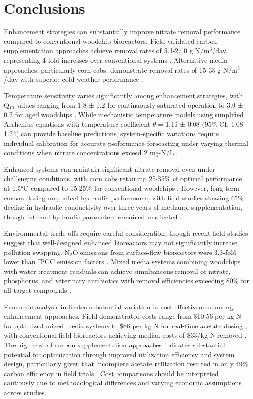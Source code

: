 \documentclass[12pt,a4paper]{article}
\begin{document}
\section{Conclusions}

Enhancement strategies can substantially improve nitrate removal performance compared to conventional woodchip bioreactors. Field-validated carbon supplementation approaches achieve removal rates of 5.1-27.0 g N/m$^3$/day, representing 4-fold increases over conventional systems \citep{RN632}. Alternative media approaches, particularly corn cobs, demonstrate removal rates of 15-38 g N/m$^3$/day with superior cold-weather performance \citep{RN350, RN624}.

Temperature sensitivity varies significantly among enhancement strategies, with Q$_{10}$ values ranging from 1.8 ± 0.2 for continuously saturated operation to 3.0 ± 0.2 for aged woodchips \citep{RN228}. While mechanistic temperature models using simplified Arrhenius equations with temperature coefficient $\theta$ = 1.16 ± 0.08 (95\% CI: 1.08-1.24) can provide baseline predictions, system-specific variations require individual calibration for accurate performance forecasting under varying thermal conditions when nitrate concentrations exceed 2 mg-N/L \citep{RN242}.

Enhanced systems can maintain significant nitrate removal even under challenging conditions, with corn cobs retaining 25-35\% of optimal performance at 1.5°C compared to 15-25\% for conventional woodchips \citep{RN350, RN624}. However, long-term carbon dosing may affect hydraulic performance, with field studies showing 65\% decline in hydraulic conductivity over three years of methanol supplementation, though internal hydraulic parameters remained unaffected \citep{RN632}.

Environmental trade-offs require careful consideration, though recent field studies suggest that well-designed enhanced bioreactors may not significantly increase pollution swapping. N$_{2}$O emissions from surface-flow bioreactors were 3.3-fold lower than IPCC emission factors \citep{RN1181}. Mixed media systems combining woodchips with water treatment residuals can achieve simultaneous removal of nitrate, phosphorus, and veterinary antibiotics with removal efficiencies exceeding 80\% for all target compounds \citep{RN370}.

Economic analysis indicates substantial variation in cost-effectiveness among enhancement approaches. Field-demonstrated costs range from \$10.56 per kg N for optimized mixed media systems \citep{RN350} to \$86 per kg N for real-time acetate dosing \citep{RN196}, with conventional field bioreactors achieving median costs of \$33/kg N removed \citep{RN289}. The high cost of carbon supplementation approaches indicates substantial potential for optimization through improved utilization efficiency and system design, particularly given that incomplete acetate utilization resulted in only 49\% carbon efficiency in field trials \citep{RN196}. Cost comparisons should be interpreted cautiously due to methodological differences and varying economic assumptions across studies.
\end{document}
